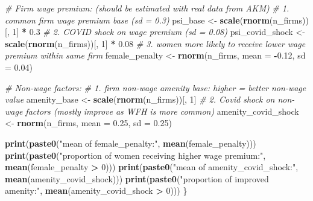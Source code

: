\documentclass[
]{article}
\newenvironment{Shaded}{\begin{snugshade}}{\end{snugshade}}
\newcommand{\AttributeTok}[1]{\textcolor[rgb]{0.13,0.29,0.53}{#1}}
\newcommand{\CommentTok}[1]{\textcolor[rgb]{0.56,0.35,0.01}{\textit{#1}}}
\newcommand{\DecValTok}[1]{\textcolor[rgb]{0.00,0.00,0.81}{#1}}
\newcommand{\FloatTok}[1]{\textcolor[rgb]{0.00,0.00,0.81}{#1}}
\newcommand{\FunctionTok}[1]{\textcolor[rgb]{0.13,0.29,0.53}{\textbf{#1}}}
\newcommand{\NormalTok}[1]{#1}
\newcommand{\OtherTok}[1]{\textcolor[rgb]{0.56,0.35,0.01}{#1}}
\newcommand{\SpecialCharTok}[1]{\textcolor[rgb]{0.81,0.36,0.00}{\textbf{#1}}}
\newcommand{\StringTok}[1]{\textcolor[rgb]{0.31,0.60,0.02}{#1}}
\begin{document}
\begin{Shaded}
\begin{Highlighting}[]
    \CommentTok{\# Firm wage premium: (should be estimated with real data from AKM)}
    \CommentTok{\# 1. common firm wage premium base (sd = 0.3)}
\NormalTok{    psi\_base }\OtherTok{\textless{}{-}} \FunctionTok{scale}\NormalTok{(}\FunctionTok{rnorm}\NormalTok{(n\_firms))[, }\DecValTok{1}\NormalTok{] }\SpecialCharTok{*} \FloatTok{0.3}
    \CommentTok{\# 2. COVID shock on wage premium (sd = 0.08)}
\NormalTok{    psi\_covid\_shock }\OtherTok{\textless{}{-}} \FunctionTok{scale}\NormalTok{(}\FunctionTok{rnorm}\NormalTok{(n\_firms))[, }\DecValTok{1}\NormalTok{] }\SpecialCharTok{*} \FloatTok{0.08}
    \CommentTok{\# 3. women more likely to receive lower wage premium within same firm}
\NormalTok{    female\_penalty }\OtherTok{\textless{}{-}} \FunctionTok{rnorm}\NormalTok{(n\_firms, }\AttributeTok{mean =} \SpecialCharTok{{-}}\FloatTok{0.12}\NormalTok{, }\AttributeTok{sd =} \FloatTok{0.04}\NormalTok{)}

    \CommentTok{\# Non{-}wage factors:}
    \CommentTok{\# 1. firm non{-}wage amenity base: higher = better non{-}wage value}
\NormalTok{    amenity\_base }\OtherTok{\textless{}{-}} \FunctionTok{scale}\NormalTok{(}\FunctionTok{rnorm}\NormalTok{(n\_firms))[, }\DecValTok{1}\NormalTok{]}
    \CommentTok{\# 2. Covid shock on non{-}wage factors (mostly improve as WFH is more common)}
\NormalTok{    amenity\_covid\_shock }\OtherTok{\textless{}{-}} \FunctionTok{rnorm}\NormalTok{(n\_firms, }\AttributeTok{mean =} \FloatTok{0.25}\NormalTok{, }\AttributeTok{sd =} \FloatTok{0.25}\NormalTok{)}
    
    \FunctionTok{print}\NormalTok{(}\FunctionTok{paste0}\NormalTok{(}\StringTok{"mean of female\_penalty:"}\NormalTok{, }\FunctionTok{mean}\NormalTok{(female\_penalty)))}
    \FunctionTok{print}\NormalTok{(}\FunctionTok{paste0}\NormalTok{(}\StringTok{"proportion of women receiving higher wage premium:"}\NormalTok{,}
                 \FunctionTok{mean}\NormalTok{(female\_penalty }\SpecialCharTok{\textgreater{}} \DecValTok{0}\NormalTok{)))}
    \FunctionTok{print}\NormalTok{(}\FunctionTok{paste0}\NormalTok{(}\StringTok{"mean of amenity\_covid\_shock:"}\NormalTok{,}
                 \FunctionTok{mean}\NormalTok{(amenity\_covid\_shock)))}
    \FunctionTok{print}\NormalTok{(}\FunctionTok{paste0}\NormalTok{(}\StringTok{"proportion of improved amenity:"}\NormalTok{,}
                 \FunctionTok{mean}\NormalTok{(amenity\_covid\_shock }\SpecialCharTok{\textgreater{}} \DecValTok{0}\NormalTok{)))}
\NormalTok{\}}
\end{Highlighting}
\end{Shaded}
\end{document}
